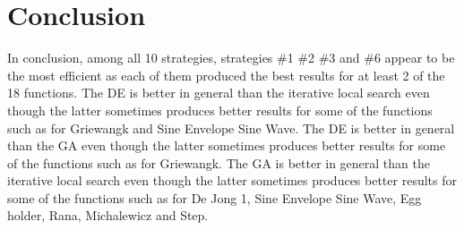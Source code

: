 \documentclass[12pt]{article}
\begin{document}
					
		\section{Conclusion}
			In conclusion, among all 10 strategies, strategies \#1 \#2 \#3 and \#6 appear to be the most efficient as each of them produced the best results for at least 2 of the 18 functions. 
			The DE is better in general than the iterative local search even though the latter sometimes produces better results for some of the functions such as for Griewangk and Sine Envelope Sine Wave.
			The DE is better in general than the GA even though the latter sometimes produces better results for some of the functions such as for Griewangk.
			The GA is better in general than the iterative local search even though the latter sometimes produces better results for some of the functions such as for De Jong 1, Sine Envelope Sine Wave, Egg holder, Rana, Michalewicz and Step.
			
\end{document}
